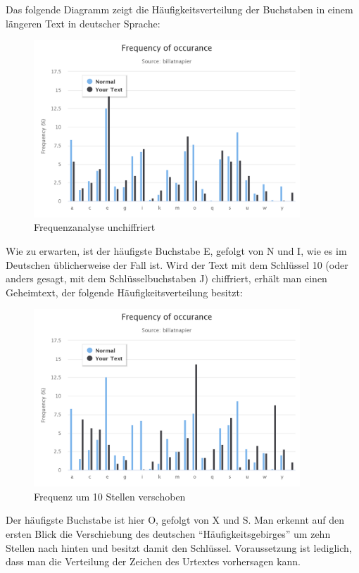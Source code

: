 \documentclass[10pt,a4paper]{article}
\begin{document}
\noindent
Das folgende Diagramm zeigt die Häufigkeitsverteilung der Buchstaben in einem längeren Text in deutscher Sprache:
\begin{figure}[H]
    \begin{center}
    \includegraphics[width=10cm]{images/frequency0.png}
    \caption{Frequenzanalyse unchiffriert}
    \label{frequencynormal}
    \end{center}
\end{figure}

\noindent
Wie zu erwarten, ist der häufigste Buchstabe E, gefolgt von N und I, wie es im Deutschen üblicherweise der Fall ist. Wird der Text mit dem Schlüssel 10 (oder anders gesagt, mit dem Schlüsselbuchstaben J) chiffriert, erhält man einen Geheimtext, der folgende Häufigkeitsverteilung besitzt:
\begin{figure}[H]
    \begin{center}
    \includegraphics[width=10cm]{images/frequency1.png}
    \caption{Frequenz um 10 Stellen verschoben}
    \label{frequencycaesar}
    \end{center}
\end{figure}

\noindent
Der häufigste Buchstabe ist hier O, gefolgt von X und S. Man erkennt auf den ersten Blick die Verschiebung des deutschen "`Häufigkeitsgebirges"' um zehn Stellen nach hinten und besitzt damit den Schlüssel. Voraussetzung ist lediglich, dass man die Verteilung der Zeichen des Urtextes vorhersagen kann.
\end{document}

